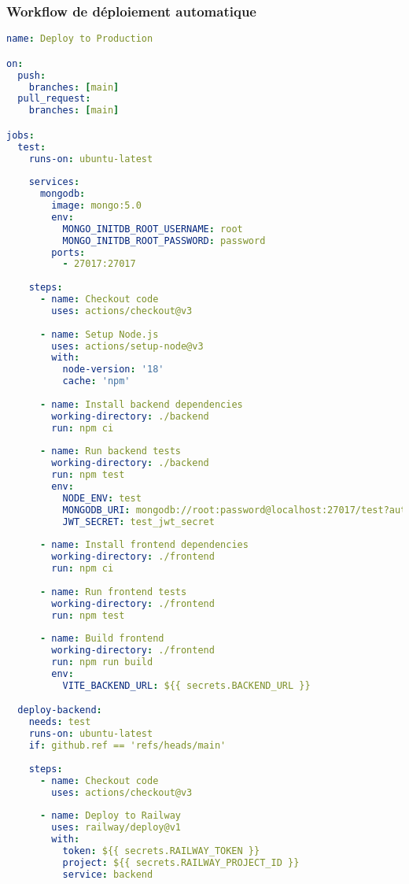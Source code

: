 \subsubsection{Workflow de déploiement automatique}

\begin{lstlisting}[language=YAML, caption=.github/workflows/deploy.yml]
name: Deploy to Production

on:
  push:
    branches: [main]
  pull_request:
    branches: [main]

jobs:
  test:
    runs-on: ubuntu-latest
    
    services:
      mongodb:
        image: mongo:5.0
        env:
          MONGO_INITDB_ROOT_USERNAME: root
          MONGO_INITDB_ROOT_PASSWORD: password
        ports:
          - 27017:27017
    
    steps:
      - name: Checkout code
        uses: actions/checkout@v3
      
      - name: Setup Node.js
        uses: actions/setup-node@v3
        with:
          node-version: '18'
          cache: 'npm'
      
      - name: Install backend dependencies
        working-directory: ./backend
        run: npm ci
      
      - name: Run backend tests
        working-directory: ./backend
        run: npm test
        env:
          NODE_ENV: test
          MONGODB_URI: mongodb://root:password@localhost:27017/test?authSource=admin
          JWT_SECRET: test_jwt_secret
      
      - name: Install frontend dependencies
        working-directory: ./frontend
        run: npm ci
      
      - name: Run frontend tests
        working-directory: ./frontend
        run: npm test
      
      - name: Build frontend
        working-directory: ./frontend
        run: npm run build
        env:
          VITE_BACKEND_URL: ${{ secrets.BACKEND_URL }}

  deploy-backend:
    needs: test
    runs-on: ubuntu-latest
    if: github.ref == 'refs/heads/main'
    
    steps:
      - name: Checkout code
        uses: actions/checkout@v3
      
      - name: Deploy to Railway
        uses: railway/deploy@v1
        with:
          token: ${{ secrets.RAILWAY_TOKEN }}
          project: ${{ secrets.RAILWAY_PROJECT_ID }}
          service: backend


\end{lstlisting}
